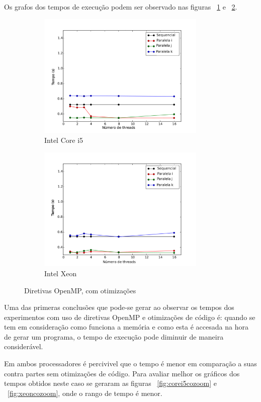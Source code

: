 \documentclass[a4paper,12pt,fleqn]{article}
\begin{document}
Os grafos dos tempos de execução podem ser observado nas figuras ~\ref{fig:corei5co} e ~\ref{fig:xeonco}. 

\begin{figure} 
    \centering
    \begin{subfigure}{.5\textwidth}
        \centering
        \includegraphics[height=6cm]{Images/corei5co} 
        \caption{Intel Core i5}
        \label{fig:corei5co} 
    \end{subfigure}%
    \begin{subfigure}{.5\textwidth}
        \centering
        \includegraphics[height=6cm]{Images/xeonco} 
        \caption{Intel Xeon}
        \label{fig:xeonco} 
    \end{subfigure}    
    \caption{Diretivas OpenMP, com otimizações}
    \label{fig:co}
\end{figure} 

Uma das primeras conclusões que pode-se gerar ao observar os tempos dos experimentos com uso de diretivas OpenMP e otimizações de código é: quando se tem em consideração como funciona a memória e como esta é accesada na hora de gerar um programa, o tempo de execução pode diminuir de maneira considerável. 

Em ambos processadores é percivivel que o tempo é menor em comparação a suas contra partes sem otimizações de código. Para avaliar melhor os gráficos dos tempos obtidos neste caso se geraram as figuras ~\ref{fig:corei5cozoom} e ~\ref{fig:xeoncozoom}, onde o rango de tempo é menor. 
\end{document}
